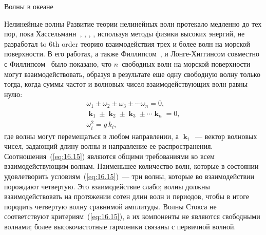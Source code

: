 \begin{chapter}{Волны в океане}
\begin{section}{Нелинейные волны}
Развитие теории нелинейных волн протекало медленно до тех пор, пока
Хассельманн~\cite{Hasselmann:1961}, \cite{Hasselmann:1963a}, 
\cite{Hasselmann:1963b}, \cite{Hasselmann:1966}, используя методы
физики высоких энергий, не разработал 
to 6th order теорию взаимодействия трех и более волн на морской поверхности.
В его работах, а также Филлипсом~\cite{Phillips:1960}, 
и Лонге-Хиггинсом совместно с Филлипсом~\cite{Longuet-Higgins:1962} 
было показано, что $n$~свободных волн на морской поверхности могут 
взаимодействовать, образуя в результате еще одну свободную волну только тогда,
когда суммы частот и волновых чисел взаимодействующих волн равны нулю:
\begin{subequations}\label{eq:16.15}
\begin{eqnarray}
 & \omega _{1} \pm \omega _{2} \pm \omega _{3} \pm \cdots \omega _{n}  = 0, & \\
 & \mbfk_{1} \pm  \mbfk_{2} \pm  \mbfk_{3} \pm \cdots \mbfk_{n} =  0,  & \\
 & \omega_{i}^{2} = g \, k_{i}, &
\end{eqnarray}
\end{subequations}
где волны могут перемещаться в любом направлении, а $\mbfk_{i}$~--- вектор
волновых чисел, задающий длину волны и направление ее распространения.
Соотношения~(\ref{eq:16.15}) являются общими требованиями ко всем 
взаимодействующим волнам. Наименьшее количество волн, которые в состоянии
удовлетворить условиям~(\ref{eq:16.15})~--- три волны, которые во 
взаимодействии порождают четвертую. Это взаимодействие слабо; волны должны
взаимодействовать на протяжении сотен длин волн и периодов, чтобы
в итоге породить четвертую волну сравнимой амплитуды. Волны Стокса не
соответствуют критериям~(\ref{eq:16.15}), а их компоненты не являются
свободными волнами; более высокочастотные гармоники связаны с первичной волной.
%

\end{section}
\end{chapter}
